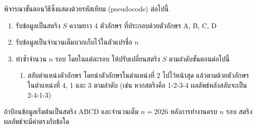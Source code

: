 \question พิจารณาขั้นตอนวิธีซึ่งแสดงด้วยรหัสเทียม (pseudocode) ต่อไปนี้
\begin{pseudocode}
\begin{enumerate}
    \item รับข้อมูลเป็นสตริง $S$ ความยาว 4 ตัวอักษร ที่ประกอบด้วยตัวอักษร A, B, C, D
    \item รับข้อมูลเป็นจำนวนเต็มบวกเก็บไว้ในตัวแปรชื่อ $n$
    \item ทำซ้ำจำนวน $n$ รอบ โดยในแต่ละรอบ ให้ปรับเปลี่ยนสตริง $S$ ตามลำดับขั้นตอนต่อไปนี้
    \begin{enumerate}
        \item สลับตำแหน่งตัวอักษร โดยนำตัวอักษรในตำแหน่งที่ 2 ไปไว้หน้าสุด แล้วตามด้วยตัวอักษรในตำแหน่งที่ 4, 1 และ 3 ตามลำดับ (เช่น หากสตริงคือ 1-2-3-4 ผลลัพธ์หลังสลับจะเป็น 2-4-1-3)
    \end{enumerate}
\end{enumerate}
\end{pseudocode}
ถ้าป้อนข้อมูลเริ่มต้นเป็นสตริง ABCD และจำนวนเต็ม $n = 2026$ หลังการทำงานครบ $n$ รอบ สตริงผลลัพธ์จะมีค่าตรงกับข้อใด \\
